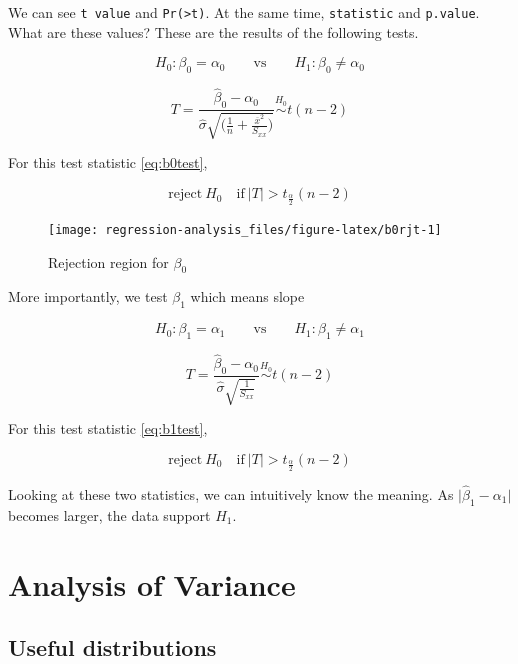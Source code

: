 \documentclass[]{book}
\theoremstyle{definition}
\theoremstyle{definition}
\theoremstyle{definition}
\theoremstyle{remark}
\begin{document}
We can see \texttt{t\ value} and \texttt{Pr(\textgreater{}\textbar{}t\textbar{})}. At the same time, \texttt{statistic} and \texttt{p.value}. What are these values? These are the results of the following tests.

\[H_0 : \beta_0 = \alpha_0 \qquad \text{vs} \qquad H_1 : \beta_0 \neq \alpha_0\]

\begin{equation}
  T = \frac{\hat\beta_0 - \alpha_0}{\hat\sigma \sqrt{\bigg( \frac{1}{n} + \frac{\overline{x}^2}{S_{xx}} \bigg)}} \stackrel{H_0}{\sim} t(n - 2)
  \label{eq:b0test}
\end{equation}

For this test statistic \eqref{eq:b0test},

\[\text{reject}\: H_0 \quad \text{if} \: \lvert T \rvert > t_{\frac{\alpha}{2}}(n - 2)\]

\begin{figure}[H]

{\centering \texttt{[image: regression-analysis\_files/figure-latex/b0rjt-1]} 

}

\caption{Rejection region for $\beta_0$}\label{fig:b0rjt}
\end{figure}

More importantly, we test \(\beta_1\) which means slope

\[H_0 : \beta_1 = \alpha_1 \qquad \text{vs} \qquad H_1 : \beta_1 \neq \alpha_1\]

\begin{equation}
  T = \frac{\hat\beta_0 - \alpha_0}{\hat\sigma \sqrt{\frac{1}{S_{xx}}}} \stackrel{H_0}{\sim} t(n - 2)
  \label{eq:b1test}
\end{equation}

For this test statistic \eqref{eq:b1test},

\[\text{reject}\: H_0 \quad \text{if} \: \lvert T \rvert > t_{\frac{\alpha}{2}}(n - 2)\]

Looking at these two statistics, we can intuitively know the meaning. As \(\lvert \hat\beta_1 - \alpha_1 \rvert\) becomes larger, the data support \(H_1\).

\hypertarget{analysis-of-variance}{%
\section{Analysis of Variance}\label{analysis-of-variance}}

\hypertarget{useful-distributions}{%
\subsection{Useful distributions}\label{useful-distributions}}
\end{document}
